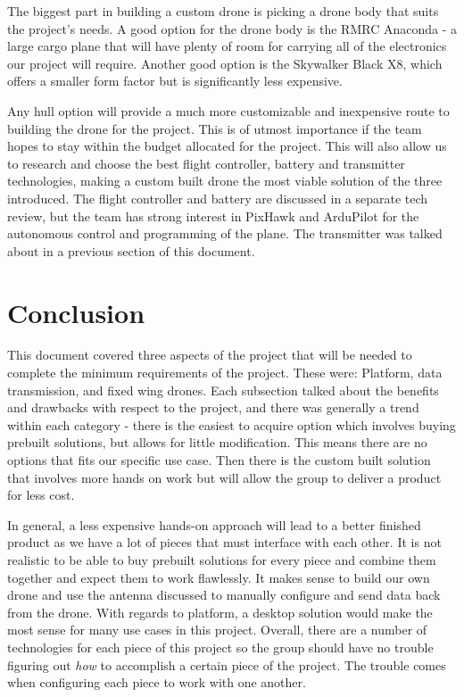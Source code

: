 \documentclass[onecolumn, draftclsnofoot,10pt, compsoc]{IEEEtran}
\begin{document}
The biggest part in building a custom drone is picking a drone body that suits the project's needs. A good option for the drone body is the RMRC Anaconda - a large cargo plane that will have plenty of room for carrying all of the electronics our project will require\cite{RMRCAnaconda}. Another good option is the Skywalker Black X8, which offers a smaller form factor but is significantly less expensive\cite{Skywalker}.

Any hull option will provide a much more customizable and inexpensive route to building the drone for the project. This is of utmost importance if the team hopes to stay within the budget allocated for the project. This will also allow us to research and choose the best flight controller, battery and transmitter technologies, making a custom built drone the most viable solution of the three introduced. The flight controller and battery are discussed in a separate tech review, but the team has strong interest in PixHawk and ArduPilot for the autonomous control and programming of the plane. The transmitter was talked about in a previous section of this document.

\section{Conclusion}

This document covered three aspects of the project that will be needed to complete the minimum requirements of the project. These were: Platform, data transmission, and fixed wing drones. Each subsection talked about the benefits and drawbacks with respect to the project, and there was generally a trend within each category - there is the easiest to acquire option which involves buying prebuilt solutions, but allows for little modification. This means there are no options that fits our specific use case. Then there is the custom built solution that involves more hands on work but will allow the group to deliver a product for less cost. 

In general, a less expensive hands-on approach will lead to a better finished product as we have a lot of pieces that must interface with each other. It is not realistic to be able to buy prebuilt solutions for every piece and combine them together and expect them to work flawlessly. It makes sense to build our own drone and use the antenna discussed to manually configure and send data back from the drone. With regards to platform, a desktop solution would make the most sense for many use cases in this project. Overall, there are a number of technologies for each piece of this project so the group should have no trouble figuring out \textit{how} to accomplish a certain piece of the project. The trouble comes when configuring each piece to work with one another.



\end{document}
